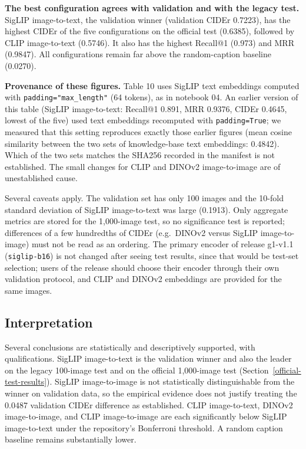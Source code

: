 \documentclass{article}
\begin{document}
\textbf{The best configuration agrees with validation and with the legacy test.}
SigLIP image-to-text, the validation winner (validation CIDEr 0.7223), has
the highest CIDEr of the five configurations on the official test (0.6385),
followed by CLIP image-to-text (0.5746). It also has the highest Recall@1
(0.973) and MRR (0.9847). All configurations remain far above the
random-caption baseline (0.0270).

\textbf{Provenance of these figures.} Table 10 uses SigLIP text embeddings
computed with \texttt{padding="max\_length"} (64 tokens), as in notebook 04.
An earlier version of this table (SigLIP image-to-text: Recall@1 0.891, MRR
0.9376, CIDEr 0.4645, lowest of the five) used text embeddings recomputed with
\texttt{padding=True}; we measured that this setting reproduces exactly those
earlier figures (mean cosine similarity between the two sets of knowledge-base
text embeddings: 0.4842). Which of the two sets matches the SHA256 recorded in
the manifest is not established. The small changes for CLIP and DINOv2
image-to-image are of unestablished cause.

Several caveats apply. The validation set has only 100 images and the
10-fold standard deviation of SigLIP image-to-text was large (0.1913).
Only aggregate metrics are stored for the 1,000-image test, so no
significance test is reported; differences of a few hundredths of CIDEr
(e.g.\ DINOv2 versus SigLIP image-to-image) must not be read as an ordering.
The primary encoder of release g1-v1.1 (\texttt{siglip-b16}) is not changed
after seeing test results, since that would be test-set selection; users of the
release should choose their encoder through their own validation protocol,
and CLIP and DINOv2 embeddings are provided for the same images.

\subsection{Interpretation}\label{interpretation}

Several conclusions are statistically and descriptively supported, with
qualifications. SigLIP image-to-text is the validation winner and also the
leader on the legacy 100-image test and on the official 1,000-image test
(Section~\ref{official-test-results}). SigLIP image-to-image is not statistically distinguishable
from the winner on validation data, so the empirical evidence does not
justify treating the 0.0487 validation CIDEr difference as established.
CLIP image-to-text, DINOv2 image-to-image, and CLIP image-to-image are
each significantly below SigLIP image-to-text under the repository's
Bonferroni threshold. A random caption baseline remains substantially
lower.
\end{document}
